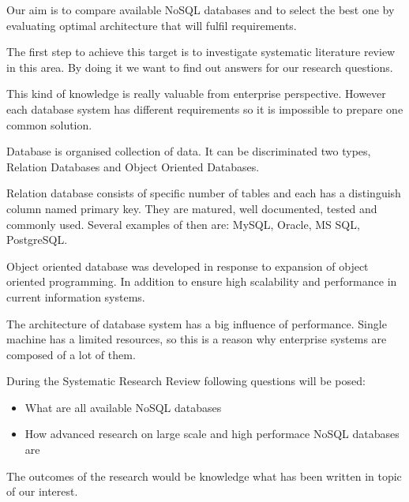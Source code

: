 \documentclass[times, 10pt,twocolumn]{article}
\begin{document}
Our aim is to compare available NoSQL databases and to select the best one by evaluating 
optimal architecture that will fulfil requirements. 

The first step to achieve this target is to investigate systematic literature review in this area.
By doing it we want to find out answers for our research questions.

This kind of knowledge is really valuable from enterprise perspective. However each database
system has different requirements so it is impossible to prepare one common solution.
 

Database is organised collection of data. It can be discriminated two types, 
Relation Databases and Object Oriented Databases.

Relation database consists of specific number of tables and each has a distinguish column named primary key. 
They are matured, well documented, tested and commonly used. Several examples of then are: MySQL, Oracle, MS SQL, PostgreSQL. 

Object oriented database was developed in response to expansion of object oriented programming. In addition to ensure high scalability and  
performance in current information systems.

The architecture of database system has a big influence of performance. Single machine has a limited
resources, so this is a reason why enterprise systems  are composed of a lot of them.


During the Systematic Research Review following questions will be posed: 

\begin{itemize}
  \item What are all available NoSQL databases
  \item How advanced research on large scale and high performace NoSQL databases are 
\end{itemize}

The outcomes of the research would be knowledge what has been written in topic of our interest.
\end{document}
